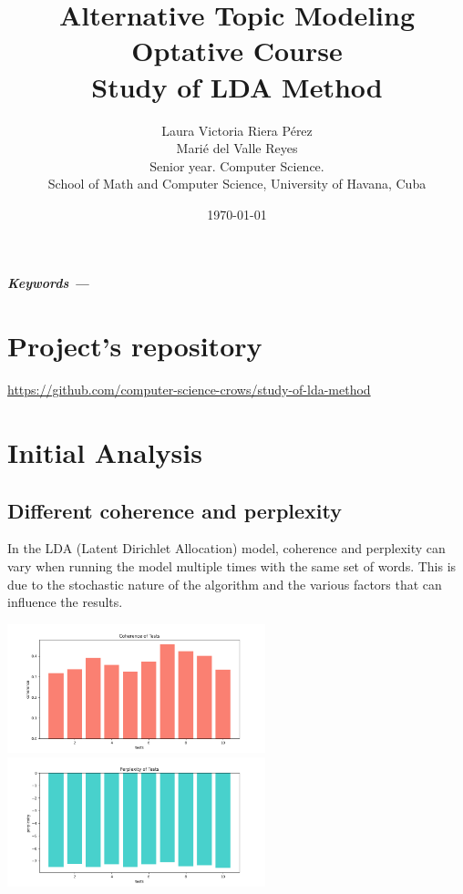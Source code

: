 \documentclass[10pt]{article} %
\title{\normalsize{Alternative Topic Modeling Optative Course}\\
	\Huge\bfseries Study of LDA Method \\
} %
\author{%
	Laura Victoria Riera P\'erez\\
	Mari\'e del Valle Reyes \vspace{1em} \\
	\small Senior year. Computer Science. \\ %
	\small School of Math and Computer Science, University of Havana, Cuba \\ %
}
\date{\footnotesize \today } %
\providecommand{\keywords}[1]
{
	\small	
	\vspace{0.5em}
	\noindent \textbf{\textit{Keywords --- }} #1
}
\renewenvironment{abstract}
{\small
	\begin{center}
		\bfseries \abstractname\vspace{-.5em}\vspace{0pt}
	\end{center}
	\list{}{
		\setlength{\leftmargin}{1.5cm}%
		\setlength{\rightmargin}{\leftmargin}%
	}%
	\item\relax}
{\endlist}
\begin{document}
	\maketitle
	
	\begin{abstract}
		\lipsum[1]
		
		\keywords{}
	\end{abstract}

	\section*{Project's repository}
	
	\begin{center}
		\href{https://github.com/computer-science-crows/study-of-lda-method}{https://github.com/computer-science-crows/study-of-lda-method}
	\end{center}
	
	\section{Initial Analysis}
	
	\subsection{Different coherence and perplexity}
	In the LDA (Latent Dirichlet Allocation) model, coherence and perplexity can vary when running the model multiple times with the same set of words. This is due to the stochastic nature of the algorithm and the various factors that can influence the results.
	
		
	\begin{center}
		\includegraphics[width=7.5cm]{images/coherence_stopwords}
		\includegraphics[width=7.5cm]{images/perplexity_stopwords}
	\end{center}
\end{document}
